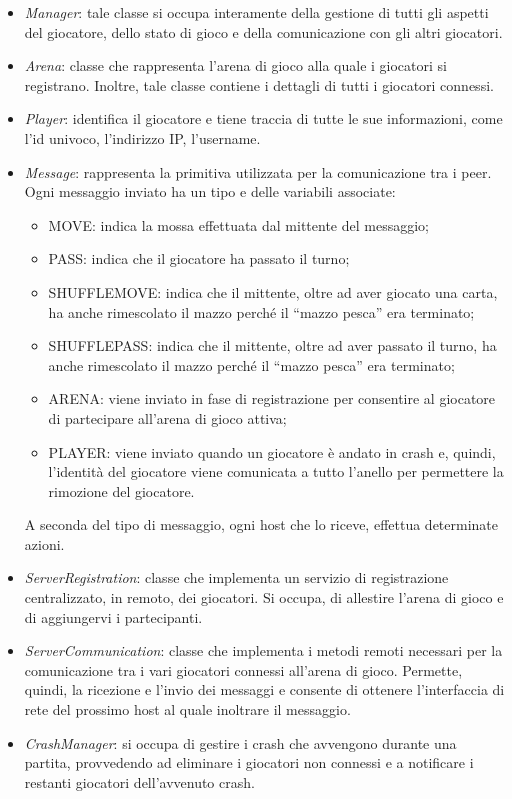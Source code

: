 \documentclass[11pt]{article} %
\begin{document}
\begin{itemize}
 \item \emph{Manager}: tale classe si occupa interamente della gestione di tutti gli aspetti del giocatore, dello stato di gioco e della comunicazione 
 con gli altri giocatori. 
 \item \emph{Arena}: classe che rappresenta l'arena di gioco alla quale i giocatori si registrano. Inoltre, tale classe contiene i dettagli di tutti i giocatori
 connessi.
 \item \emph{Player}: identifica il giocatore e tiene traccia di tutte le sue informazioni, come l'id univoco, l'indirizzo IP, l'username.
 \item \emph{Message}: rappresenta la primitiva utilizzata per la comunicazione tra i peer. Ogni messaggio inviato ha un tipo e delle variabili associate:
 \begin{itemize}
  \item MOVE: indica la mossa effettuata dal mittente del messaggio;
  \item PASS: indica che il giocatore ha passato il turno;
  \item SHUFFLEMOVE: indica che il mittente, oltre ad aver giocato una carta, ha anche rimescolato il mazzo perché il ``mazzo pesca'' era terminato;  
  \item SHUFFLEPASS: indica che il mittente, oltre ad aver passato il turno, ha anche rimescolato il mazzo perché il ``mazzo pesca'' era terminato;
  \item ARENA: viene inviato in fase di registrazione per consentire al giocatore di partecipare all'arena di gioco attiva;
  \item PLAYER: viene inviato quando un giocatore è andato in crash e, quindi, l'identità del giocatore viene comunicata a tutto l'anello per permettere 
  la rimozione del giocatore.
 \end{itemize}
 A seconda del tipo di messaggio, ogni host che lo riceve, effettua determinate azioni.
 \item \emph{ServerRegistration}: classe che implementa un servizio di registrazione centralizzato, in remoto, dei giocatori. Si occupa, di allestire l'arena
 di gioco e di aggiungervi i partecipanti.
 \item \emph{ServerCommunication}: classe che implementa i metodi remoti necessari per la comunicazione tra i vari giocatori connessi all'arena di gioco. 
 Permette, quindi, la ricezione e l'invio dei messaggi e consente di ottenere l'interfaccia di rete del prossimo host al quale inoltrare il messaggio.
 \item \emph{CrashManager}: si occupa di gestire i crash che avvengono durante una partita, provvedendo ad eliminare i giocatori non connessi e a notificare
 i restanti giocatori dell'avvenuto crash.
\end{itemize}
\end{document}
